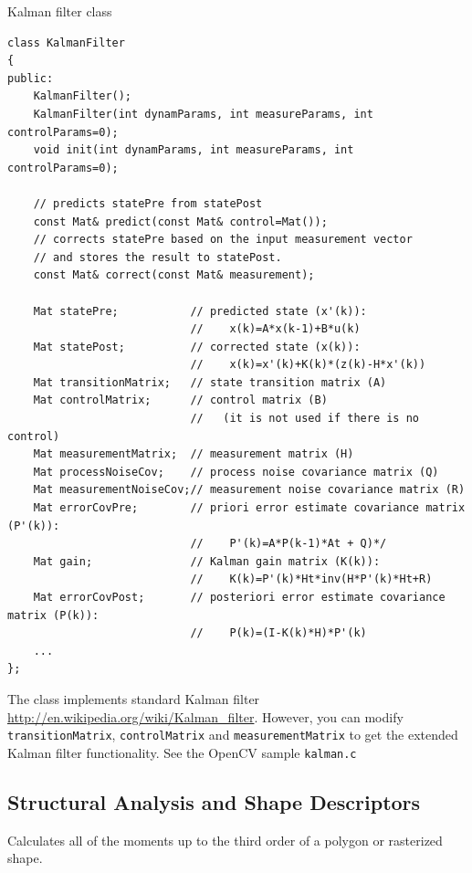 \label{KalmanFilter}
Kalman filter class

\begin{lstlisting}
class KalmanFilter
{
public:
    KalmanFilter();
    KalmanFilter(int dynamParams, int measureParams, int controlParams=0);
    void init(int dynamParams, int measureParams, int controlParams=0);

    // predicts statePre from statePost
    const Mat& predict(const Mat& control=Mat());
    // corrects statePre based on the input measurement vector
    // and stores the result to statePost. 
    const Mat& correct(const Mat& measurement);

    Mat statePre;           // predicted state (x'(k)):
                            //    x(k)=A*x(k-1)+B*u(k)
    Mat statePost;          // corrected state (x(k)):
                            //    x(k)=x'(k)+K(k)*(z(k)-H*x'(k))
    Mat transitionMatrix;   // state transition matrix (A)
    Mat controlMatrix;      // control matrix (B)
                            //   (it is not used if there is no control)
    Mat measurementMatrix;  // measurement matrix (H)
    Mat processNoiseCov;    // process noise covariance matrix (Q)
    Mat measurementNoiseCov;// measurement noise covariance matrix (R)
    Mat errorCovPre;        // priori error estimate covariance matrix (P'(k)):
                            //    P'(k)=A*P(k-1)*At + Q)*/
    Mat gain;               // Kalman gain matrix (K(k)):
                            //    K(k)=P'(k)*Ht*inv(H*P'(k)*Ht+R)
    Mat errorCovPost;       // posteriori error estimate covariance matrix (P(k)):
                            //    P(k)=(I-K(k)*H)*P'(k)
    ...
};
\end{lstlisting}

The class implements standard Kalman filter \url{http://en.wikipedia.org/wiki/Kalman_filter}. However, you can modify \texttt{transitionMatrix}, \texttt{controlMatrix} and \texttt{measurementMatrix} to get the extended Kalman filter functionality. See the OpenCV sample \texttt{kalman.c}


\subsection{Structural Analysis and Shape Descriptors}

\label{moments}
Calculates all of the moments up to the third order of a polygon or rasterized shape.


